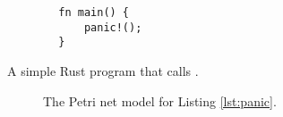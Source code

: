 \begin{listing}[!htb]
    \begin{verbatim}
        fn main() {
            panic!();
        }        
    \end{verbatim}
    \caption{A simple Rust program that calls .}
    \label{lst:panic}
\end{listing}

\begin{figure}[!htb]
    \centering
    
    \caption{The Petri net model for Listing \ref{lst:panic}.}
    \label{fig:panic}
\end{figure}